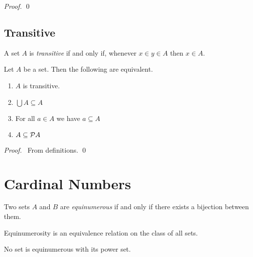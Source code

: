 \begin{proof}
    \pf
    \qed
\end{proof}

\section{Transitive}

\begin{definition}
    A set $A$ is \emph{transitive} if and only if, whenever $x \in y \in A$
    then $x \in A$.
\end{definition}

\begin{theorem}
    Let $A$ be a set. Then the following are equivalent.
    \begin{enumerate}
        \item $A$ is transitive.
        \item $\bigcup A \subseteq A$
        \item For all $a \in A$ we have $a \subseteq A$
        \item $A \subseteq \mathcal{P} A$
    \end{enumerate}
\end{theorem}

\begin{proof}
    \pf\ From definitions. \qed
\end{proof}

\chapter{Cardinal Numbers}

\begin{definition}[Equinumerous]
    Two sets $A$ and $B$ are \emph{equinumerous} if and only if there exists
    a bijection between them.
\end{definition}

\begin{theorem}
    Equinumerosity is an equivalence relation on the class of all sets.
\end{theorem}

\begin{theorem}[Cantor]
    No set is equinumerous with its power set.
\end{theorem}

